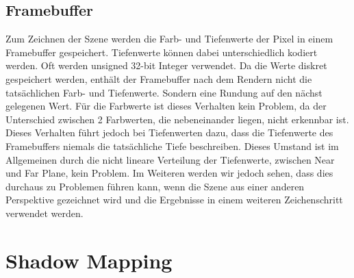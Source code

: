 \section{Framebuffer}
Zum Zeichnen der Szene werden die Farb- und Tiefenwerte der Pixel in einem Framebuffer gespeichert.
Tiefenwerte können dabei unterschiedlich kodiert werden. 
Oft werden unsigned 32-bit Integer verwendet.
Da die Werte diskret gespeichert werden, enthält der Framebuffer nach dem Rendern nicht die tatsächlichen Farb- und Tiefenwerte.
Sondern eine Rundung auf den nächst gelegenen Wert.
Für die Farbwerte ist dieses Verhalten kein Problem, da der Unterschied zwischen 2 Farbwerten, die nebeneinander liegen, nicht erkennbar ist.
Dieses Verhalten führt jedoch bei Tiefenwerten dazu, dass die Tiefenwerte des Framebuffers niemals die tatsächliche Tiefe beschreiben.
Dieses Umstand ist im Allgemeinen durch die nicht lineare Verteilung der Tiefenwerte, zwischen Near und Far Plane, kein Problem.
Im Weiteren werden wir jedoch sehen, dass dies durchaus zu Problemen führen kann, wenn die Szene aus einer anderen Perspektive gezeichnet wird 
und die Ergebnisse in einem weiteren Zeichenschritt verwendet werden.

\chapter{Shadow Mapping} %
\label{section:shadow-mapping}
